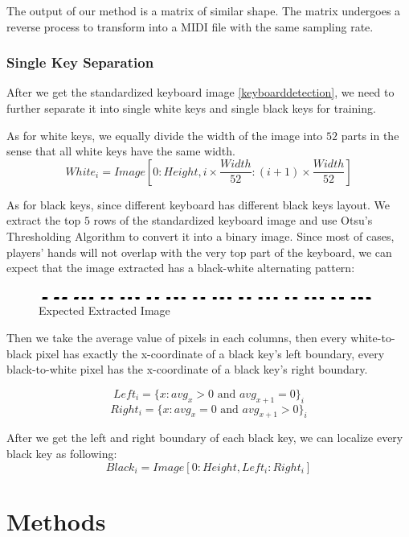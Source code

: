 \documentclass[10pt,twocolumn,letterpaper]{article}
\begin{document}
The output of our method is a matrix of similar shape. 
The matrix undergoes a reverse process to transform into a MIDI file with the same sampling rate.

\subsubsection{Single Key Separation} \label{single-key-sep}

After we get the standardized keyboard image \ref{keyboarddetection}, we need to further separate it into single white keys and single black keys for training.

As for white keys, we equally divide the width of the image into \(52\) parts in the sense that all white keys have the same width.
\[White_i = Image[0:Height, i \times \frac{Width}{52}: (i + 1)\times\frac{Width}{52}]\]

As for black keys, since different keyboard has different black keys layout. We extract the top \(5\) rows of the standardized keyboard image and use Otsu's Thresholding Algorithm to convert it into a binary image. Since most of cases, players' hands will not overlap with the very top part of the keyboard, we can expect that the image extracted has a black-white alternating pattern:

\begin{figure}[h!]
   \centering
   \includegraphics[width=\linewidth, height=0.04\linewidth]{fig/17.jpg}
   \caption{Expected Extracted Image}
\end{figure}

Then we take the average value of pixels in each columns, then every white-to-black pixel has exactly the x-coordinate of a black key's left boundary, every black-to-white pixel has the x-coordinate of a black key's right boundary.

\[Left_i = \{x: avg_x > 0 \text{ and } avg_{x + 1} = 0\}_i\]
\[Right_i = \{x: avg_x = 0 \text{ and } avg_{x + 1} > 0\}_i\]

After we get the left and right boundary of each black key, we can localize every black key as following:
\[Black_i = Image[0:Height, Left_i : Right_i]\]


\section{Methods}
\end{document}
